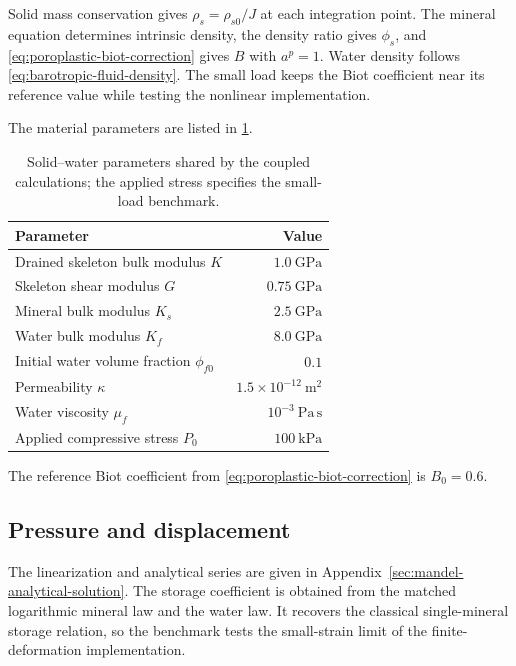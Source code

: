 Solid mass conservation gives \(\rho_s=\rho_{s0}/J\) at each
integration point.  The mineral equation determines intrinsic density,
the density ratio gives
\(\phi_s\), and \eqref{eq:poroplastic-biot-correction} gives \(B\) with
\(a^p=1\).  Water density follows
\eqref{eq:barotropic-fluid-density}.  The small load keeps the Biot coefficient
near its reference value while testing the nonlinear implementation.

The material parameters are listed in \cref{tab:mandel-parameters}.
\begin{table}[ht]
 \centering
 \caption{Solid--water parameters shared by the coupled calculations;
 the applied stress specifies the small-load benchmark.}
 \label{tab:mandel-parameters}
 \begin{tabular}{lr}
  \toprule
  Parameter & Value \\
  \midrule
  Drained skeleton bulk modulus \(K\) & \(1.0\ \mathrm{GPa}\) \\
  Skeleton shear modulus \(G\) & \(0.75\ \mathrm{GPa}\) \\
  Mineral bulk modulus \(K_s\) & \(2.5\ \mathrm{GPa}\) \\
  Water bulk modulus \(K_f\) & \(8.0\ \mathrm{GPa}\) \\
  Initial water volume fraction \(\phi_{f0}\) & \(0.1\) \\
  Permeability \(\kappa\) & \(1.5\times10^{-12}\ \mathrm{m^2}\) \\
  Water viscosity \(\mu_f\) & \(10^{-3}\ \mathrm{Pa\,s}\) \\
  Applied compressive stress \(P_0\) & \(100\ \mathrm{kPa}\) \\
  \bottomrule
 \end{tabular}
\end{table}

The reference Biot coefficient from
\eqref{eq:poroplastic-biot-correction} is \(B_0=0.6\).


\subsection{Pressure and displacement}
\label{sec:mandel-numerical-comparison}

The linearization and analytical series are given in
Appendix~\ref{sec:mandel-analytical-solution}.  The storage coefficient is
obtained from the matched logarithmic mineral law and the water law.  It
recovers the classical single-mineral storage relation, so the benchmark
tests the small-strain limit of the finite-deformation implementation.

